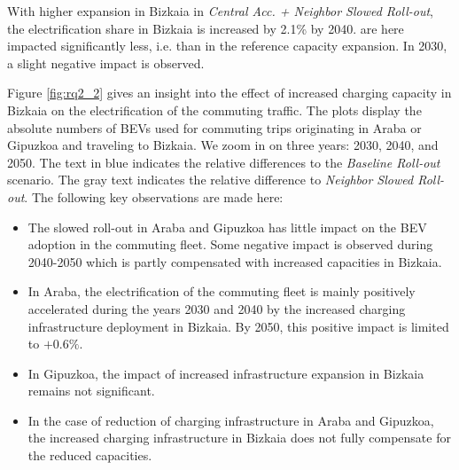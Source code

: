 \documentclass[preprint,review,11pt, authoryear]{elsarticle}
\begin{document}
    With higher expansion in Bizkaia in \textit{Central Acc. + Neighbor Slowed Roll-out}, the electrification share in Bizkaia is increased by 2.1\% by 2040.  are here impacted significantly less, i.e.\added{,} than in the reference capacity expansion. In 2030, a slight negative impact is observed.

    Figure \ref{fig:rq2_2} gives an insight into the effect of increased charging capacity in Bizkaia on the electrification of the commuting traffic. The plots display the absolute numbers of BEVs used for commuting trips originating in Araba or Gipuzkoa and traveling to Bizkaia. We zoom in on three years: 2030, 2040, and 2050. The text in blue indicates the relative differences to the \textit{Baseline Roll-out} scenario. The gray text indicates the relative difference to \textit{Neighbor Slowed Roll-out}. The following  key observations are made here:
    
    \begin{itemize}

        
        \item The slowed roll-out in Araba and Gipuzkoa has little impact on the BEV adoption in the commuting fleet. Some negative impact is observed during 2040-2050 which is partly compensated with increased capacities in Bizkaia.

        \item In Araba, the electrification of the commuting fleet is mainly positively accelerated during the years 2030 and 2040 by the increased charging infrastructure deployment in Bizkaia. By 2050, this positive impact is limited to $+0.6\%$. 

        \item In Gipuzkoa, the impact of increased infrastructure expansion in Bizkaia remains not significant.

        \item In the case of reduction of charging infrastructure in Araba and Gipuzkoa, the increased charging infrastructure in Bizkaia does not fully compensate for the reduced capacities. 
            
    \end{itemize}

    
\end{document}

